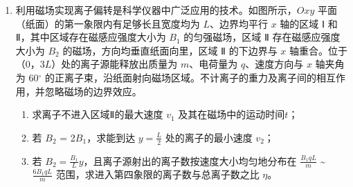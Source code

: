 \documentclass[\gkver]{gaokaozhenti}
\begin{document}
\begin{enumerate}
{导体杆运动的距离 $L = \frac{{0 - v_0^2}}{{2a}} = \frac{{v_0^2}}{{4g}}$

（2）回路的电动势 $E = B_{2}dv$

其中 $v = v_{0} + at$

解得 $E = \frac{{6Mg}}{I}$($v_{0} -$ 2$gt$)

（3）由能量关系 $UI = Fv + I^{2}R$

其中 $v = v_{0} + at$

可得 $U = \frac{{3Mg}}{I}$ ($v_{0} -$ 2$gt$) + $IR$

输出能量 $W = UIt$ = 3$Mg$($v_{0}t -$ 2$gt^{2}$) + $I^{2}Rt$

（4）装置 A 可回收火箭的动能和重力势能；从开始火箭从速度 $v_{0}$ 到平台速度减为零，则

${{E' = \frac{1}{2}Mv_{0}}^{2} + MgL = \frac{3}{4}Mv_{0}}^{2}$
}

\item
利用磁场实现离子偏转是科学仪器中广泛应用的技术。如图所示，$Oxy$ 平面（纸面）的第一象限内有足够长且宽度均为 $L$、边界均平行 $x$ 轴的区域 Ⅰ 和 Ⅱ，其中区域存在磁感应强度大小为 $B_{1}$ 的匀强磁场，区域 Ⅱ 存在磁感应强度大小为 $B_{2}$ 的磁场，方向均垂直纸面向里，区域 Ⅱ 的下边界与 $x$ 轴重合。位于（0，3$L$）处的离子源能释放出质量为 $m$、电荷量为 $q$、速度方向与 $x$ 轴夹角为 60${^\circ}$ 的正离子束，沿纸面射向磁场区域。不计离子的重力及离子间的相互作用，并忽略磁场的边界效应。
\begin{enumerate}
	\item
	求离子不进入区域Ⅱ的最大速度 $v_{1}$ 及其在磁场中的运动时间$t$；
	\item
	若 $B_{2}$ = 2$B_{1}$，求能到达 $y = \frac{L}{2}$ 处的离子的最小速度 $v_{2}$；
	\item
	若 $B_{2} = \frac{{{B_1}}}{L}y$，且离子源射出的离子数按速度大小均匀地分布在 $\frac{{{B_1}qL}}{m}$ \textasciitilde{} $\frac{{6{B_1}qL}}{m}$ 范围，求进入第四象限的离子数与总离子数之比 $\eta$。
\end{enumerate}
\onepicture[align=right, w=4.87cm]{}
\end{enumerate}
\end{document}
